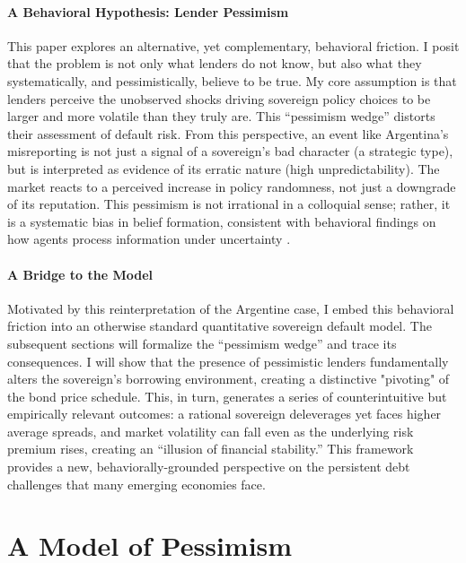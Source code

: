 \documentclass[12pt]{article}
\theoremstyle{plain}
\begin{document}
\paragraph{A Behavioral Hypothesis: Lender Pessimism}
This paper explores an alternative, yet complementary, behavioral friction. I
posit that the problem is not only what lenders do not know, but also what they
systematically, and pessimistically, believe to be true. My core assumption is
that lenders perceive the unobserved shocks driving sovereign policy choices to
be larger and more volatile than they truly are. This ``pessimism wedge''
distorts their assessment of default risk. From this perspective, an event like
Argentina's misreporting is not just a signal of a sovereign's bad character (a
strategic type), but is interpreted as evidence of its erratic nature (high
unpredictability). The market reacts to a perceived increase in policy
randomness, not just a downgrade of its reputation. This pessimism is not
irrational in a colloquial sense; rather, it is a systematic bias in belief
formation, consistent with behavioral findings on how agents process
information under uncertainty \citep{TverskyKahneman1974, BarberisThaler2003}.

\paragraph{A Bridge to the Model}
Motivated by this reinterpretation of the Argentine case, I embed this
behavioral friction into an otherwise standard quantitative sovereign default
model. The subsequent sections will formalize the ``pessimism wedge'' and trace
its consequences. I will show that the presence of pessimistic lenders
fundamentally alters the sovereign's borrowing environment, creating a
distinctive "pivoting" of the bond price schedule. This, in turn, generates a
series of counterintuitive but empirically relevant outcomes: a rational
sovereign deleverages yet faces higher average spreads, and market volatility
can fall even as the underlying risk premium rises, creating an ``illusion of
financial stability.'' This framework provides a new, behaviorally-grounded
perspective on the persistent debt challenges that many emerging economies
face.

\section{A Model of Pessimism}
\label{sec:model}
\end{document}
